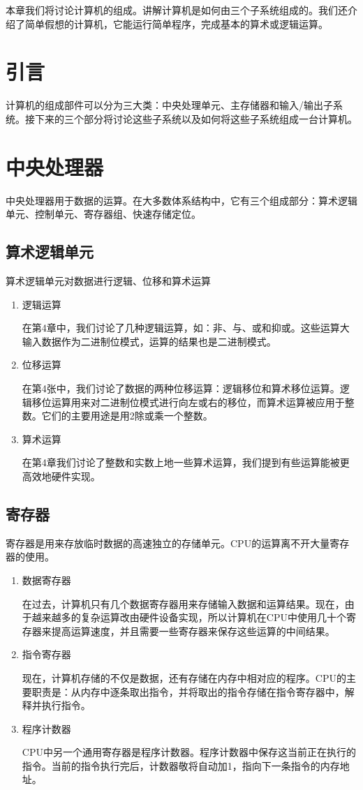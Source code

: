 
本章我们将讨论计算机的组成。讲解计算机是如何由三个子系统组成的。我们还介绍了简单假想的计算机，它能运行简单程序，完成基本的算术或逻辑运算。

\section{引言}
计算机的组成部件可以分为三大类：中央处理单元、主存储器和输入/输出子系统。接下来的三个部分将讨论这些子系统以及如何将这些子系统组成一台计算机。
\section{中央处理器}
中央处理器用于数据的运算。在大多数体系结构中，它有三个组成部分：算术逻辑单元、控制单元、寄存器组、快速存储定位。
\subsection{算术逻辑单元}
算术逻辑单元对数据进行逻辑、位移和算术运算
\begin{enumerate}
	\item 逻辑运算

	在第4章中，我们讨论了几种逻辑运算，如：非、与、或和抑或。这些运算大输入数据作为二进制位模式，运算的结果也是二进制模式。
	\item 位移运算

	在第4张中，我们讨论了数据的两种位移运算：逻辑移位和算术移位运算。逻辑移位运算用来对二进制位模式进行向左或右的移位，而算术运算被应用于整数。它们的主要用途是用2除或乘一个整数。
	\item 算术运算

	在第4章我们讨论了整数和实数上地一些算术运算，我们提到有些运算能被更高效地硬件实现。
\end{enumerate}
\subsection{寄存器}
寄存器是用来存放临时数据的高速独立的存储单元。CPU的运算离不开大量寄存器的使用。
\begin{enumerate}
	\item 数据寄存器

	在过去，计算机只有几个数据寄存器用来存储输入数据和运算结果。现在，由于越来越多的复杂运算改由硬件设备实现，所以计算机在CPU中使用几十个寄存器来提高运算速度，并且需要一些寄存器来保存这些运算的中间结果。
	\item 指令寄存器 

	现在，计算机存储的不仅是数据，还有存储在内存中相对应的程序。CPU的主要职责是：从内存中逐条取出指令，并将取出的指令存储在指令寄存器中，解释并执行指令。

	\item 程序计数器

	CPU中另一个通用寄存器是程序计数器。程序计数器中保存这当前正在执行的指令。当前的指令执行完后，计数器敬将自动加1，指向下一条指令的内存地址。
\end{enumerate}
